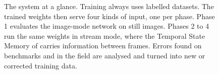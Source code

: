 \begin{figure}[p]
\vspace{4mm}
\caption[The system at a glance]{The system at a glance. Training always
uses labelled datasets. The trained weights then serve four kinds of input,
one per phase. Phase 1 evaluates the image-mode network on still images.
Phases 2 to 4 run the same weights in stream mode, where the Temporal State
Memory of \methodS{} carries information between frames. Errors found on
benchmarks and in the field are analysed and turned into new or corrected
training data.}
\label{fig:glance}
\end{figure}
